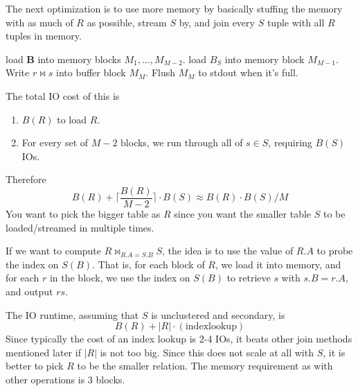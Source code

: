     \begin{algo}
      The next optimization is to use more memory by basically stuffing the memory with as much of $R$ as possible, stream $S$ by, and join every $S$ tuple with all $R$ tuples in memory. 
      \begin{algorithm}[H]
        \begin{algorithmic}
              \State load $\mathbf{B}$ into memory blocks $M_1, \ldots, M_{M-2}$. 
                \State load $B_S$ into memory block $M_{M-1}$. 
                    \State Write $r \bowtie s$ into buffer block $M_M$. 
                    \State Flush $M_M$ to stdout when it's full. 
                  \EndIf
                \EndFor
              \EndFor
            \EndFor 
          \EndFunction
        \end{algorithmic}
      \end{algorithm}
      The total IO cost of this is 
      \begin{enumerate}
        \item $B(R)$ to load $R$. 
        \item For every set of $M-2$ blocks, we run through all of $s \in S$, requiring $B(S)$ IOs. 
      \end{enumerate}
      Therefore 
      \begin{equation}
        B(R) + \bigg\lceil \frac{B(R)}{M-2} \bigg\rceil \cdot B(S) \approx B(R) \cdot B(S) / M
      \end{equation}
      You want to pick the bigger table as $R$ since you want the smaller table $S$ to be loaded/streamed in multiple times. 
    \end{algo}

    \begin{algo}
      If we want to compute $R \bowtie_{R.A = S.B} S$, the idea is to use the value of $R.A$ to probe the index on $S(B)$. That is, for each block of $R$, we load it into memory, and for each $r$ in the block, we use the index on $S(B)$ to retrieve $s$ with $s.B = r.A$, and output $rs$. 

      The IO runtime, assuming that $S$ is unclustered and secondary, is 
      \begin{equation}
        B(R) + |R| \cdot (\mathrm{index lookup}) 
      \end{equation}
      Since typically the cost of an index lookup is 2-4 IOs, it beats other join methods mentioned later if $|R|$ is not too big. Since this does not scale at all with $S$, it is better to pick $R$ to be the smaller relation. The memory requirement as with other operations is $3$ blocks. 
    \end{algo}

